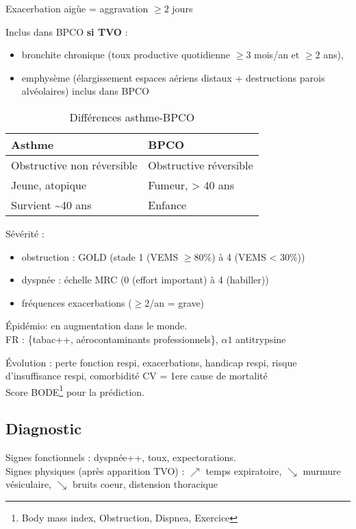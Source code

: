 Exacerbation aigùe = aggravation \(\ge 2\) jours

Inclus dans BPCO \textbf{si TVO} : 
\begin{itemize}
\item bronchite chronique (toux productive quotidienne \(\ge 3\) mois/an et \(\ge 2\) ans),
\item emphysème (élargissement espaces aériens distaux + destructions parois
alvéolaires) inclus dans BPCO
\end{itemize}

\begin{table}[htbp]
  \caption{Différences asthme-BPCO}
  \centering
  \begin{tabular}{ll}
    \toprule
    Asthme & BPCO\\
    \midrule
    Obstructive non réversible & Obstructive réversible\\
    Jeune, atopique & Fumeur, > 40 ans\\
    Survient \textasciitilde{}40 ans & Enfance\\
    \bottomrule
  \end{tabular}
\end{table}

Sévérité : 
\begin{itemize}
\item obstruction : GOLD (stade 1 (VEMS $\ge 80\%$) à 4 (VEMS < 30\%))
\item dyspnée : échelle MRC (0 (effort important) à 4 (habiller))
\item fréquences exacerbations ($\ge 2$/an = grave)
\end{itemize}

Épidémio: en augmentation dans le monde. \\
FR : \{tabac++, aérocontaminants professionnels\}, \(\alpha{}1\) antitrypsine

Évolution : perte fonction respi, exacerbations, handicap respi, risque
d'insuffisance respi, comorbidité CV = 1ere cause de mortalité\\
Score BODE\footnote{Body mass index, Obstruction, Dispnea, Exercice} pour la prédiction.

\subsection{Diagnostic}
Signes fonctionnels : dyspnée++, toux, expectorations.\\
Signes physiques (après apparition TVO) : \(\nearrow\) temps expiratoire,
\(\searrow\) murmure vésiculaire, $\searrow$ bruits coeur, distension thoracique


